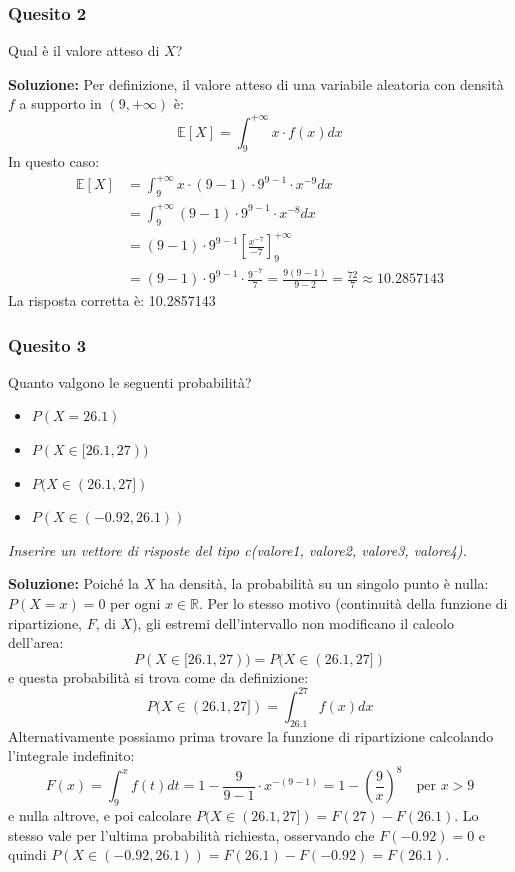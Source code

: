 \documentclass[12pt, a4paper]{article}
\begin{document}
\newpage

\subsubsection*{Quesito 2}
Qual è il valore atteso di $X$?

\textbf{Soluzione:}
Per definizione, il valore atteso di una variabile aleatoria con densità $f$ a supporto in $(9, +\infty)$ è:
$$ \mathbb{E}[X] = \int_9^{+\infty} x \cdot f(x) dx $$
In questo caso:
$$ \begin{aligned} \mathbb{E}[X] &= \int_9^{+\infty} x \cdot (9-1) \cdot 9^{9-1} \cdot x^{-9} dx \\ &= \int_9^{+\infty} (9-1) \cdot 9^{9-1} \cdot x^{-8} dx \\ &= (9-1) \cdot 9^{9-1} \left[ \frac{x^{-7}}{-7} \right]_9^{+\infty} \\ &= (9-1) \cdot 9^{9-1} \cdot \frac{9^{-7}}{7} = \frac{9(9-1)}{9-2} = \frac{72}{7} \approx 10.2857143 \end{aligned} $$
La risposta corretta è: 10.2857143

\subsubsection*{Quesito 3}
Quanto valgono le seguenti probabilità?
\begin{itemize}
    \item $P(X=26.1)$
    \item $P(X \in [26.1, 27))$
    \item $P(X \in (26.1, 27])$
    \item $P(X \in (-0.92, 26.1))$
\end{itemize}
\textit{Inserire un vettore di risposte del tipo c(valore1, valore2, valore3, valore4).}

\textbf{Soluzione:}
Poiché la $X$ ha densità, la probabilità su un singolo punto è nulla: $P(X=x)=0$ per ogni $x \in \mathbb{R}$.
Per lo stesso motivo (continuità della funzione di ripartizione, $F$, di $X$), gli estremi dell'intervallo non modificano il calcolo dell'area:
$$ P(X \in [26.1, 27)) = P(X \in (26.1, 27]) $$
e questa probabilità si trova come da definizione:
$$ P(X \in (26.1, 27]) = \int_{26.1}^{27} f(x) dx $$
Alternativamente possiamo prima trovare la funzione di ripartizione calcolando l'integrale indefinito:
$$ F(x) = \int_9^x f(t) dt = 1 - \frac{9}{9-1} \cdot x^{-(9-1)} = 1 - \left(\frac{9}{x}\right)^8 \quad \text{per } x>9 $$
e nulla altrove, e poi calcolare $P(X \in (26.1, 27]) = F(27) - F(26.1)$.
Lo stesso vale per l’ultima probabilità richiesta, osservando che $F(-0.92)=0$ e quindi $P(X \in (-0.92, 26.1)) = F(26.1) - F(-0.92) = F(26.1)$.
\end{document}
